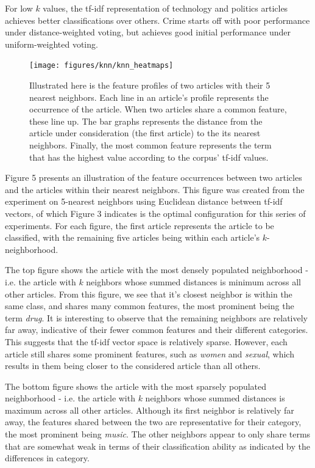 \documentclass[11pt]{article}
\begin{document}
For low $k$ values, the tf-idf representation of technology and politics articles achieves better classifications over others.
Crime starts off with poor performance under distance-weighted voting, but achieves good initial performance under uniform-weighted voting.


\begin{figure}[h!] \label{fig:heatmap_neighborhoods}
  \centering
  \texttt{[image: figures/knn/knn\_heatmaps]}
  \caption{Illustrated here is the feature profiles of two articles with their 5 nearest neighbors.
  Each line in an article's profile represents the occurrence of the article.
  When two articles share a common feature, these line up.
  The bar graphs represents the distance from the article under consideration (the first article) to the its nearest neighbors.
  Finally, the most common feature represents the term that has the highest value according to the corpus' tf-idf values.}
\end{figure}

Figure 5 presents an illustration of the feature occurrences between two articles and the articles within their nearest neighbors.
This figure was created from the experiment on 5-nearest neighbors using Euclidean distance between tf-idf vectors, of which Figure 3 indicates is the optimal configuration for this series of experiments.
For each figure, the first article represents the article to be classified, with the remaining five articles being within each article's $k$-neighborhood.

The top figure shows the article with the most densely populated neighborhood - i.e. the article with $k$ neighbors whose summed distances is minimum across all other articles.
From this figure, we see that it's closest neighbor is within the same class, and shares many common features, the most prominent being the term \emph{drug}.
It is interesting to observe that the remaining neighbors are relatively far away, indicative of their fewer common features and their different categories.
This suggests that the tf-idf vector space is relatively sparse.
However, each article still shares some prominent features, such as \emph{women} and \emph{sexual}, which results in them being closer to the considered article than all others.

The bottom figure shows the article with the most sparsely populated neighborhood - i.e. the article with $k$ neighbors whose summed distances is maximum across all other articles.
Although its first neighbor is relatively far away, the features shared between the two are representative for their category, the most prominent being \emph{music}.
The other neighbors appear to only share terms that are somewhat weak in terms of their classification ability as indicated by the differences in category.
\end{document}
